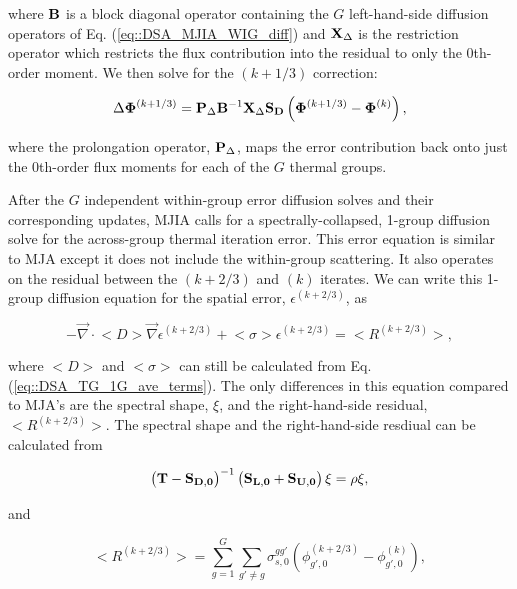 \noindent where ${\bf B}$ is a block diagonal operator containing the $G$ left-hand-side diffusion operators of Eq. (\ref{eq::DSA_MJIA_WIG_diff}) and ${\bf X}_{\Delta}$ is the restriction operator which restricts the flux contribution into the residual to only the 0th-order moment. We then solve for the $(k+1/3)$ correction:

\begin{equation}
\label{eq::DSA_MJIA_WIG_phiterm}
 \Delta {\bf \Phi}^{(k+1/3)} = {\bf P}_{\Delta} {\bf B}^{-1} {\bf X}_{\Delta} {\bf S_D} \left(  {\bf \Phi}^{(k+1/3)} - {\bf \Phi}^{(k)} \right),
\end{equation}

\noindent where the prolongation operator, ${\bf P}_{\Delta}$, maps the error contribution back onto just the 0th-order flux moments for each of the $G$ thermal groups.

After the $G$ independent within-group error diffusion solves and their corresponding updates, MJIA calls for a spectrally-collapsed, 1-group diffusion solve for the across-group thermal iteration error. This error equation is similar to MJA except it does not include the within-group scattering. It also operates on the residual between the $(k+2/3)$ and $(k)$ iterates. We can write this 1-group diffusion equation for the spatial error, $\epsilon^{(k+2/3)}$, as

\begin{equation}
\label{eq::DSA_MJIA_EC_diff_eq}
-\vec{\nabla} \cdot \big< D \big> \vec{\nabla} \epsilon^{(k+2/3)}  + \big< \sigma \big> \epsilon^{(k+2/3)}  = \big< R^{(k+2/3)} \big> ,
\end{equation}

\noindent where $\big< D \big>$ and $\big< \sigma \big>$ can still be calculated from Eq. (\ref{eq::DSA_TG_1G_ave_terms}). The only differences in this equation compared to MJA's are the spectral shape, $\xi$, and the right-hand-side residual, $\big< R^{(k+2/3)} \big>$. The spectral shape and the right-hand-side resdiual can be calculated from

\begin{equation}
\label{eq::DSA_MJIA_eigenpprob}
\left(  {\bf T} - {\bf S_{D,0}} \right)^{-1} \left( {\bf S_{L,0}} +  {\bf S_{U,0}} \right)\xi = \rho \xi ,
\end{equation}

\noindent and 

\begin{equation}
\label{eq::DSA_WGS_diff_residual}
\big< R^{(k+2/3)} \big> = \sum_{g=1}^G \sum_{g' \neq g} \sigma_{s,0}^{g g'} \left( \phi_{g',0}^{(k+2/3)} - \phi_{g',0}^{(k)} \right) ,
\end{equation}

